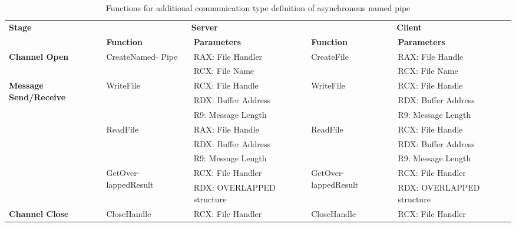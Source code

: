     \begin{table}[h]
        \centering
        \caption{Functions for additional communication type definition of asynchronous named pipe}
        \label{asynfunctions}
        \begin{tabular}{|p{1.8cm}|l|l|l|l|}
            \hline
             \multirow{2}{*}{\textbf{Stage}} &
               \multicolumn{2}{c|}{\textbf{Server}} &
               \multicolumn{2}{c|}{\textbf{Client}} \\
             \cline{2-5}
              & \textbf{Function}& \textbf{Parameters} & \textbf{Function} & \textbf{Parameters}  \\
             \hline
             \multirow{2}{*}{\parbox{1.8cm}{\textbf{Channel Open}}}
             &\multirow{2}{*}{\parbox{2.5cm}{CreateNamed- Pipe}} &  RAX: File Handler & \multirow{2}{*}{CreateFile} &  RAX: File Handle\\
              \cline{3-3} \cline{5-5}
             &&  RCX: File Name &  &  RCX: File Name\\
            \hline
             \multirow{8}{*}{\parbox{1.8cm}{\textbf{Message Send/Receive}}}
             &\multirow{3}{*}{WriteFile} &  RCX: File Handle & \multirow{3}{*}{WriteFile} &  RCX: File Handle\\
              \cline{3-3} \cline{5-5}
             &&  RDX: Buffer Address &  &  RDX: Buffer Address\\
                           \cline{3-3} \cline{5-5}
             & &  R9: Message Length &  &  R9: Message Length\\
            \cline{2-5} 

             & \multirow{3}{*}{ReadFile}&  RAX: File Handle & \multirow{3}{*}{ReadFile} &  RCX: File Handle\\
              \cline{3-3} \cline{5-5}
              &&  RDX: Buffer Address &  &  RDX: Buffer Address\\
                           \cline{3-3} \cline{5-5}
             & &  R9: Message Length &  &  R9: Message Length\\
              \cline{2-5} 
             & \multirow{2}{*}{\parbox{2.5cm}{GetOver- lappedResult}}&  RCX: File Handler & \multirow{2}{*}{\parbox{2.5cm}{GetOver- lappedResult}} &  RCX: File Handler\\
              \cline{3-3} \cline{5-5}
             & &  RDX:  OVERLAPPED structure &  &  RDX:  OVERLAPPED structure\\
                         \hline
                         
                          \multirow{2}{*}{\parbox{1.8cm}{\textbf{Channel Close}}}
             &\multirow{2}{*}{CloseHandle} & \multirow{2}{*}{RCX: File Handler} & \multirow{2}{*}{CloseHandle} &  \multirow{2}{*}{RCX: File Handler}\\
             &&   &  & \\
            \hline
        \end{tabular}
    \end{table}
    


